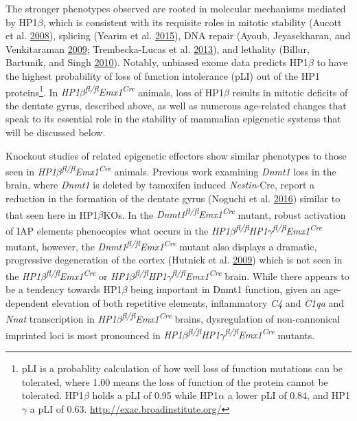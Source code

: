 \documentclass[onehalf,12pt]{beavtex}
\begin{document}
  The stronger phenotypes observed are rooted in molecular mechanisms
  mediated by HP1\(\beta\), which is consistent with its requisite roles
  in mitotic stability (Aucott et al.
  \protect\hyperlink{ref-AucottHP1requireddevelopment2008}{2008}),
  splicing (Yearim et al.
  \protect\hyperlink{ref-YearimHP1InvolvedRegulating2015}{2015}), DNA
  repair (Ayoub, Jeyasekharan, and Venkitaraman
  \protect\hyperlink{ref-AyoubMobilizationrecruitmentHP1v2009}{2009};
  Trembecka-Lucas et al.
  \protect\hyperlink{ref-Trembecka-LucasDynamicsHP1vPCNAcontainingcomplexes2013}{2013}),
  and lethality (Billur, Bartunik, and Singh
  \protect\hyperlink{ref-BilluressentialfunctionHP1v2010}{2010}). Notably,
  unbiased exome data predicts HP1\(\beta\) to have the highest
  probability of loss of function intolerance (pLI) out of the HP1
  proteins\footnote{pLI is a probablity calculation of how well loss of
    function mutations can be tolerated, where 1.00 means the loss of
    function of the protein cannot be tolerated. HP1\(\beta\) holds a pLI
    of 0.95 while HP1\(\alpha\) a lower pLI of 0.84, and HP1\(\gamma\) a
    pLI of 0.63. \url{http://exac.broadinstitute.org/}}. In
  \emph{HP1\(\beta\)\textsuperscript{fl/fl}Emx1\textsuperscript{Cre}}
  animals, loss of HP1\(\beta\) results in mitotic deficits of the dentate
  gyrus, described above, as well as numerous age-related changes that
  speak to its essential role in the stability of mammalian epigenetic
  systems that will be discussed below.
  
  Knockout studies of related epigenetic effectors show similar phenotypes
  to those seen in
  \emph{HP1\(\beta\)\textsuperscript{fl/fl}Emx1\textsuperscript{Cre}}
  animals. Previous work examining \emph{Dnmt1} loss in the brain, where
  \emph{Dnmt1} is deleted by tamoxifen induced \emph{Nestin}-Cre, report a
  reduction in the formation of the dentate gyrus (Noguchi et al.
  \protect\hyperlink{ref-NoguchiDNAMethyltransferaseIndispensable2016}{2016})
  similar to that seen here in HP1\(\beta\)KOs. In the
  \emph{Dnmt1\textsuperscript{fl/fl}Emx1\textsuperscript{Cre}} mutant,
  robust activation of IAP elements phenocopies what occurs in the
  \emph{HP1\(\beta\)\textsuperscript{fl/fl}HP1\(\gamma\)\textsuperscript{fl/fl}Emx1\textsuperscript{Cre}}
  mutant, however, the
  \emph{Dnmt1\textsuperscript{fl/fl}Emx1\textsuperscript{Cre}} mutant also
  displays a dramatic, progressive degeneration of the cortex (Hutnick et
  al.
  \protect\hyperlink{ref-HutnickDNAhypomethylationrestricted2009}{2009})
  which is not seen in the
  \emph{HP1\(\beta\)\textsuperscript{fl/fl}Emx1\textsuperscript{Cre}} or
  \emph{HP1\(\beta\)\textsuperscript{fl/fl}HP1\(\gamma\)\textsuperscript{fl/fl}Emx1\textsuperscript{Cre}}
  brain. While there appears to be a tendency towards HP1\(\beta\) being
  important in Dnmt1 function, given an age-dependent elevation of both
  repetitive elements, inflammatory \emph{C4} and \emph{C1qa} and
  \emph{Nnat} transcription in
  \emph{HP1\(\beta\)\textsuperscript{fl/fl}Emx1\textsuperscript{Cre}}
  brains, dysregulation of non-cannonical imprinted loci is most
  pronounced in
  \emph{HP1\(\beta\)\textsuperscript{fl/fl}HP1\(\gamma\)\textsuperscript{fl/fl}Emx1\textsuperscript{Cre}}
  mutants.
  
\end{document}
